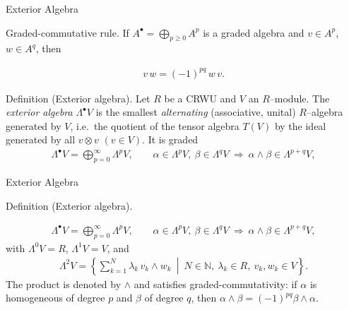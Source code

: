 
\date{24 October 2025}



\begin{frame}
  \cmctitleframe
\end{frame}

\begin{frame}{Exterior Algebra}

\begin{block}{Graded-commutative rule.} If $A^\bullet=\bigoplus_{p\ge 0}A^p$ is a graded algebra and $v\in A^p$, $w\in A^q$, then

\begin{align*}
v\,w = (-1)^{pq}\,w\,v.
\end{align*}
\end{block}

\vspace{-0.3cm}
\begin{block}{Definition (Exterior algebra).}
Let $R$ be a CRWU and $V$ an $R$–module. The \emph{exterior algebra} $\Lambda^\bullet V$ is the smallest \emph{alternating} (associative, unital) $R$–algebra generated by $V$, i.e.\ the quotient of the tensor algebra $T(V)$ by the ideal generated by all $v\otimes v$ $(v\in V)$.
It is graded
\begin{align*}
\Lambda^\bullet V=\bigoplus_{p=0}^\infty \Lambda^p V,\qquad
\alpha\in\Lambda^p V,\ \beta\in\Lambda^q V \ \Rightarrow\ \alpha\wedge\beta\in\Lambda^{p+q}V,
\end{align*}

\end{block}
\end{frame}

\begin{frame}{Exterior Algebra}

\begin{block}{Definition (Exterior algebra).}
\vspace{-0.3cm}

\begin{align*}
\Lambda^\bullet V=\bigoplus_{p=0}^\infty \Lambda^p V,\qquad
\alpha\in\Lambda^p V,\ \beta\in\Lambda^q V \ \Rightarrow\ \alpha\wedge\beta\in\Lambda^{p+q}V,
\end{align*}
with $\Lambda^0V=R$, $\Lambda^1V=V$, and
\begin{align*}
\Lambda^2V=\left\{\sum_{k=1}^N \lambda_k\, v_k\wedge w_k \ \middle|\ N\in\mathbb{N},\ \lambda_k\in R,\ v_k,w_k\in V \right\}.
\end{align*}
The product is denoted by $\wedge$ and satisfies graded-commutativity: if $\alpha$ is homogeneous of degree $p$ and $\beta$ of degree $q$, then $\alpha\wedge\beta=(-1)^{pq}\beta\wedge\alpha$.
\end{block}
\end{frame}

